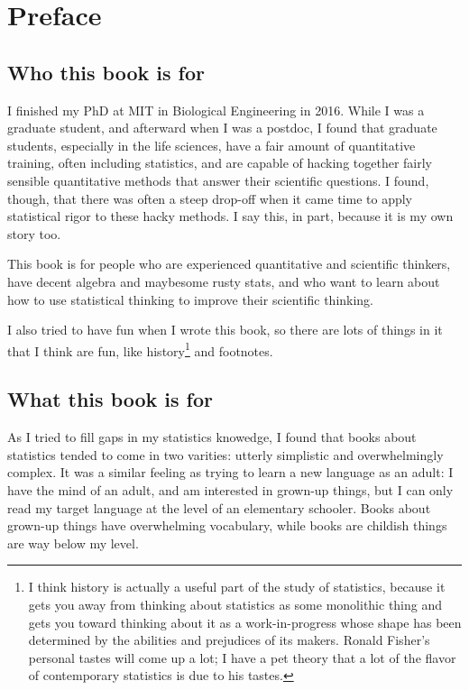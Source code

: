 \chapter{Preface}

\section*{Who this book is for}

I finished my PhD at MIT in Biological Engineering in 2016. While I was a
graduate student, and afterward when I was a postdoc, I found that graduate
students, especially in the life sciences, have a fair amount of quantitative
training, often including statistics, and are capable of hacking together
fairly sensible quantitative methods that answer their scientific questions. I
found, though, that there was often a steep drop-off when it came time to apply
statistical rigor to these hacky methods. I say this, in part, because it is my
own story too.

This book is for people who are experienced quantitative and scientific
thinkers, have decent algebra and maybesome rusty stats, and who want to learn
about how to use statistical thinking to improve their scientific thinking.

I also tried to have fun when I wrote this book, so there are lots of things
in it that I think are fun, like history\footnote{I think history is actually
a useful part of the study of statistics, because it gets you away from
thinking about statistics as some monolithic thing and gets you toward
thinking about it as a work-in-progress whose shape has been determined by the
abilities and prejudices of its makers. Ronald Fisher's personal tastes will
come up a lot; I have a pet theory that a lot of the flavor of contemporary
statistics is due to his tastes.} and footnotes.

\section*{What this book is for}

As I tried to fill gaps in my statistics knowedge, I found that books about
statistics tended to come in two varities: utterly simplistic and
overwhelmingly complex. It was a similar feeling as trying to learn a new
language as an adult: I have the mind of an adult, and am interested in
grown-up things, but I can only read my target language at the level of an
elementary schooler. Books about grown-up things have overwhelming vocabulary,
while books are childish things are way below my level.

